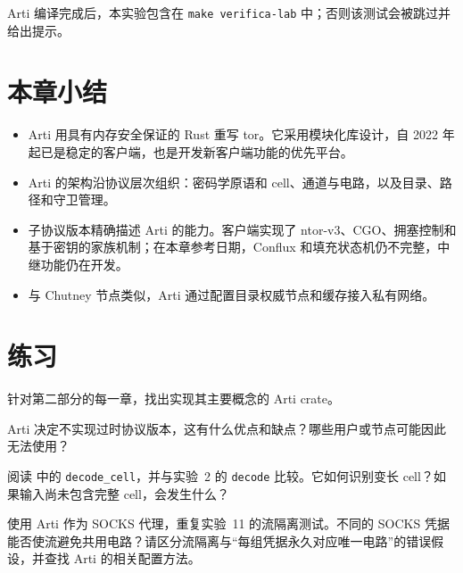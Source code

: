 Arti 编译完成后，本实验包含在 \texttt{make verifica-lab} 中；否则该测试会被跳过并给出提示。

\section*{本章小结}
\begin{itemize}
  \item Arti 用具有内存安全保证的 Rust 重写 tor。它采用模块化库设计，自 2022 年起已是稳定的客户端，也是开发新客户端功能的优先平台。
  \item Arti 的架构沿协议层次组织：密码学原语和 cell、通道与电路，以及目录、路径和守卫管理。
  \item 子协议版本精确描述 Arti 的能力。客户端实现了 ntor-v3、CGO、拥塞控制和基于密钥的家族机制；在本章参考日期，Conflux 和填充状态机仍不完整，中继功能仍在开发。
  \item 与 Chutney 节点类似，Arti 通过配置目录权威节点和缓存接入私有网络。
\end{itemize}

\section*{练习}

\begin{esercizio}[1]\label{es:30-crate}
针对第二部分的每一章，找出实现其主要概念的 Arti crate。
\end{esercizio}

\begin{esercizio}[1]\label{es:30-obsoleto}
Arti 决定不实现过时协议版本，这有什么优点和缺点？哪些用户或节点可能因此无法使用？
\end{esercizio}

\begin{esercizio}[2]\label{es:30-cella}
阅读  中的 \texttt{decode\_cell}，并与实验~2 的 \texttt{decode} 比较。它如何识别变长 cell？如果输入尚未包含完整 cell，会发生什么？
\end{esercizio}

\begin{esercizio}[2]\label{es:30-isolamento}
使用 Arti 作为 SOCKS 代理，重复实验~11 的流隔离测试。不同的 SOCKS 凭据能否使流避免共用电路？请区分流隔离与“每组凭据永久对应唯一电路”的错误假设，并查找 Arti 的相关配置方法。
\end{esercizio}

